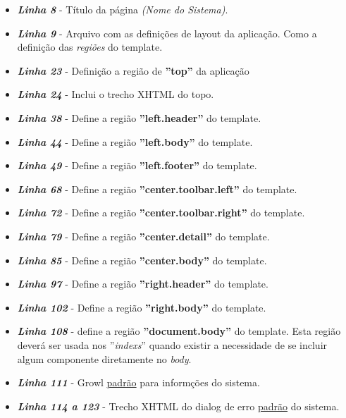 \documentclass[a4paper,10pt]{article}
\begin{document}

	\begin{itemize}
  		\item \textbf{\emph{Linha 8}} - Título da página \emph{(Nome do Sistema)}.
  		\item \textbf{\emph{Linha 9}} - Arquivo com as definições de layout da
  		aplicação. Como a definição das \emph{regiões} do template.
  		\item \textbf{\emph{Linha 23}} - Definição a região de \textbf{''top''} da
  		aplicação
  		\item \textbf{\emph{Linha 24}} - Inclui o trecho XHTML do topo.
  		\item \textbf{\emph{Linha 38}} - Define a região \textbf{''left.header''} do
		template.
		\item \textbf{\emph{Linha 44}} - Define a região \textbf{''left.body''} do
		template.
		\item \textbf{\emph{Linha 49}} - Define a região \textbf{''left.footer''} do
		template.
		\item \textbf{\emph{Linha 68}} - Define a região \textbf{''center.toolbar.left''}
		do template.
		\item \textbf{\emph{Linha 72}} - Define a região \textbf{''center.toolbar.right''}
		do template.
		\item \textbf{\emph{Linha 79}} - Define a região \textbf{''center.detail''} do
		template.
		\item \textbf{\emph{Linha 85}} - Define a região \textbf{''center.body''} do
		template.
		\item \textbf{\emph{Linha 97}} - Define a região \textbf{''right.header''} do
		template.
		\item \textbf{\emph{Linha 102}} - Define a região \textbf{''right.body''} do
		template.
		\item \textbf{\emph{Linha 108}} - define a região \textbf{''document.body''}
		do template. Esta região deverá ser usada nos ''\emph{indexs}'' quando existir a
		necessidade de se incluir algum componente diretamente no \emph{body}.
		\item \textbf{\emph{Linha 111}} - Growl \underline{padrão} para informções do
		sistema.
		\item \textbf{\emph{Linha 114 a 123}} - Trecho XHTML do dialog de erro
		\underline{padrão} do sistema.
	\end{itemize}
% 
%
\end{document}
